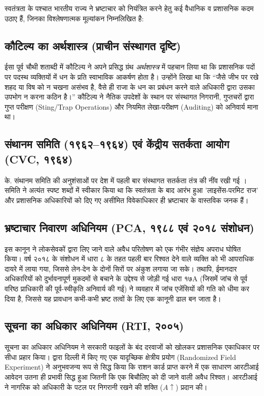 \documentclass[11pt, a4paper]{article}
\begin{document}
स्वतंत्रता के पश्चात भारतीय राज्य ने भ्रष्टाचार को नियंत्रित करने हेतु कई वैधानिक व प्रशासनिक कदम उठाए हैं, जिनका विश्लेषणात्मक मूल्यांकन निम्नलिखित है:

\subsection{कौटिल्य का अर्थशास्त्र (प्राचीन संस्थागत दृष्टि)}
ईसा पूर्व चौथी शताब्दी में कौटिल्य ने अपने प्रसिद्ध ग्रंथ \textit{अर्थशास्त्र} में पहचान लिया था कि प्रशासनिक पदों पर पदस्थ व्यक्तियों में धन के प्रति स्वाभाविक आकर्षण होता है। उन्होंने लिखा था कि ``जैसे जीभ पर रखे शहद या विष को न चखना असंभव है, वैसे ही राजा के धन का प्रबंधन करने वाले अधिकारी द्वारा उसका उपभोग न करना कठिन है।'' कौटिल्य ने नैतिक उपदेशों के स्थान पर संस्थागत निगरानी, गुप्तचरों द्वारा गुप्त परीक्षण (Sting/Trap Operations) और नियमित लेखा-परीक्षण (Auditing) को अनिवार्य माना था।

\subsection{संथानम समिति (१९६२--१९६४) एवं केंद्रीय सतर्कता आयोग (CVC, १९६४)}
के. संथानम समिति की अनुशंसाओं पर देश में पहली बार संस्थागत सतर्कता तंत्र की नींव रखी गई \citep{santhanam1964}। समिति ने अत्यंत स्पष्ट शब्दों में स्वीकार किया था कि स्वतंत्रता के बाद आरंभ हुआ 'लाइसेंस-परमिट राज' और प्रशासनिक अधिकारियों को दिए गए असीमित विवेकाधिकार ही भ्रष्टाचार के वास्तविक जनक हैं।

\subsection{भ्रष्टाचार निवारण अधिनियम (PCA, १९८८ एवं २०१८ संशोधन)}
इस कानून ने लोकसेवकों द्वारा लिए जाने वाले अवैध परितोषण को एक गंभीर संज्ञेय अपराध घोषित किया। वर्ष २०१८ के संशोधन में धारा ८ के तहत पहली बार रिश्वत देने वाले व्यक्ति को भी आपराधिक दायरे में लाया गया, जिससे लेन-देन के दोनों सिरों पर अंकुश लगाया जा सके। तथापि, ईमानदार अधिकारियों को दुर्भावनापूर्ण मुकदमों से बचाने के उद्देश्य से जोड़ी गई धारा १७A (जिसमें जांच से पूर्व वरिष्ठ प्राधिकारी की पूर्व-स्वीकृति अनिवार्य की गई) ने व्यवहार में जांच एजेंसियों की गति को धीमा कर दिया है, जिससे यह प्रावधान कभी-कभी भ्रष्ट तत्वों के लिए एक कानूनी ढाल बन जाता है।

\subsection{सूचना का अधिकार अधिनियम (RTI, २००५)}
सूचना का अधिकार अधिनियम ने सरकारी फाइलों के बंद दरवाजों को खोलकर प्रशासनिक एकाधिकार पर सीधा प्रहार किया। \citep{peisakhin2010} द्वारा दिल्ली में किए गए एक यादृच्छिक क्षेत्रीय प्रयोग (Randomized Field Experiment) ने अनुभवजन्य रूप से सिद्ध किया कि राशन कार्ड प्राप्त करने में एक साधारण आरटीआई आवेदन उतना ही प्रभावी सिद्ध हुआ जितनी कि एक बिचौलिए को दी जाने वाली अवैध रिश्वत। आरटीआई ने नागरिक को अधिकारी के पटल पर निगरानी रखने की शक्ति ($A \uparrow$) प्रदान की।
\end{document}
